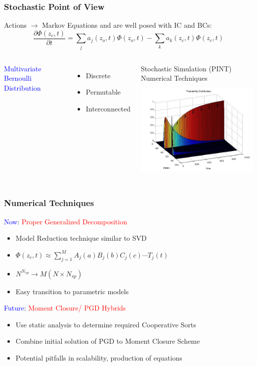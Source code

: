 
\begin{frame}
 \frametitle{Stochastic Point of View}
 Actions $\rightarrow$ Markov Equations and are well posed with IC and BCs:
    \[
\frac{\partial \Phi(z_c,t)}{\partial t} = \sum_j  a_j(z_o,t)\Phi(z_o,t) -\sum_k a_k(z_c,t)\Phi(z_c,t)
\]
\begin{columns}
 \textcolor{blue}{Multivariate Bernoulli Distribution}
 \begin{itemize}
  \item Discrete
  \item Permutable
  \item Interconnected
 \end{itemize}
 Stochastic Simulation (PINT)\\
 Numerical Techniques
  \includegraphics[trim=0mm 0mm -50mm 0mm, width=70mm,height=50mm]{./figures/MH_probab_plot.jpg}
\hfill
\end{columns}

\end{frame}


\begin{frame}
 \frametitle{Numerical Techniques}
 \textcolor{blue}{Now}: \textcolor{red}{Proper Generalized Decomposition}
 \begin{itemize}
 \item Model Reduction technique similar to SVD
  \item $\Phi(z_c,t) \approx \sum\limits^{M}_{j=1}A_j(a) B_j(b)  C_j(c)\cdots T_j(t)$
  \item $N^{N_{sp}}\rightarrow M\left( N\times N_{sp} \right)$
  \item Easy transition to parametric models
 \end{itemize}
 \vspace{1cm}
\textcolor{blue}{Future}: \textcolor{red}{Moment Closure/ PGD Hybrids}
\begin{itemize}
 \item Use static analysis to determine required Cooperative Sorts
 \item Combine initial solution of PGD to Moment Closure Scheme
 \item Potential pitfalls in scalability, production of equations
\end{itemize}


\end{frame}
